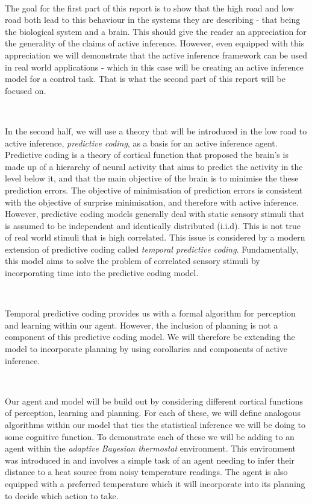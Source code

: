 \documentclass{article}
\begin{document}
\

The goal for the first part of this report is to show that the high road and low road both lead to this behaviour in the systems they are describing - that being the biological system and a brain. This should give the reader an appreciation for the generality of the claims of active inference. However, even equipped with this appreciation we will demonstrate that the active inference framework can be used in real world applications - which in this case will be creating an active inference model for a control task. That is what the second part of this report will be focused on.

\

In the second half, we will use a theory that will be introduced in the low road to active inference, \textit{predictive coding}, as a basis for an active inference agent. Predictive coding is a theory of cortical function that proposed the brain's is made up of a hierarchy of neural activity that aims to predict the activity in the level below it, and that the main objective of the brain is to minimise the these prediction errors. The objective of minimisation of prediction errors is consistent with the objective of surprise minimisation, and therefore with active inference. However, predictive coding models generally deal with static sensory stimuli that is assumed to be independent and identically distributed (i.i.d). This is not true of real world stimuli that is high correlated. This issue is considered by a modern extension of predictive coding called \textit{temporal predictive coding}. Fundamentally, this model aims to solve the problem of correlated sensory stimuli by incorporating time into the predictive coding model. 

\

Temporal predictive coding provides us with a formal algorithm for perception and learning within our agent. However, the inclusion of planning is not a component of this predictive coding model. We will therefore be extending the model to incorporate planning by using corollaries and components of active inference. 

\

Our agent and model will be build out by considering different cortical functions of perception, learning and planning. For each of these, we will define analogous algorithms within our model that ties the statistical inference we will be doing to some cognitive function. To demonstrate each of these we will be adding to an agent within the \textit{adaptive Bayesian thermostat} environment. This environment was introduced in \citet{buckley2017free} and involves a simple task of an agent needing to infer their distance to a heat source from noisy temperature readings. The agent is also equipped with a preferred temperature which it will incorporate into its planning to decide which action to take.
\end{document}
